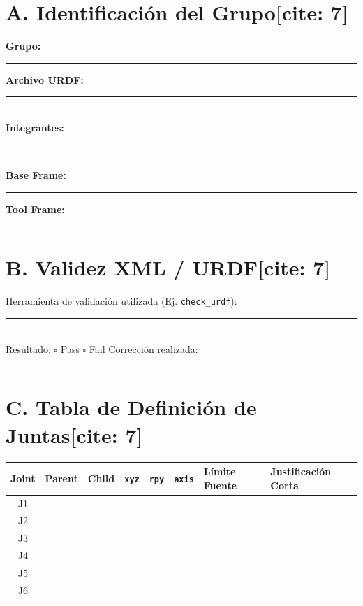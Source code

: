 \documentclass[11pt, a4paper]{article}
\begin{document}
\section*{A. Identificación del Grupo[cite: 7]}
\textbf{Grupo:} \rule{4cm}{0.15mm} \quad \textbf{Archivo URDF:} \rule{4cm}{0.15mm} \\
\textbf{Integrantes:} \rule{10cm}{0.15mm} \\
\textbf{Base Frame:} \rule{4cm}{0.15mm} \quad \textbf{Tool Frame:} \rule{4cm}{0.15mm}

\section*{B. Validez XML / URDF[cite: 7]}
Herramienta de validación utilizada (Ej. \texttt{check\_urdf}): \rule{5cm}{0.15mm} \\
Resultado: $\square$ Pass \quad $\square$ Fail \qquad Corrección realizada: \rule{5cm}{0.15mm}

\section*{C. Tabla de Definición de Juntas[cite: 7]}
\begin{center}
    \footnotesize
    \renewcommand{\arraystretch}{1.5}
    \noindent\begin{tabularx}{\textwidth}{|c|c|c|c|c|c|X|X|}
    \hline
    \textbf{Joint} & \textbf{Parent} & \textbf{Child} & \textbf{\texttt{xyz}} & \textbf{\texttt{rpy}} & \textbf{\texttt{axis}} & \textbf{Límite Fuente} & \textbf{Justificación Corta} \\ \hline
    J1 & & & & & & & \\ \hline
    J2 & & & & & & & \\ \hline
    J3 & & & & & & & \\ \hline
    J4 & & & & & & & \\ \hline
    J5 & & & & & & & \\ \hline
    J6 & & & & & & & \\ \hline
    \end{tabularx}
\end{center}
\end{document}
